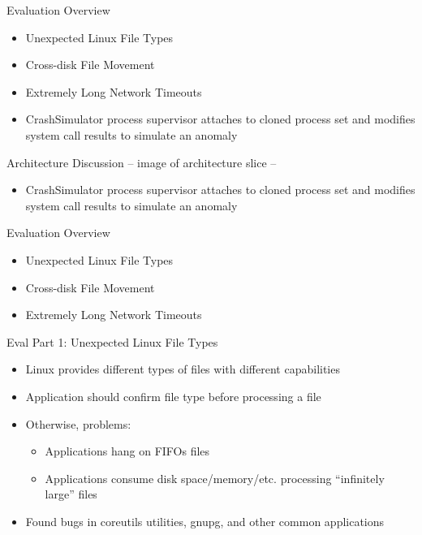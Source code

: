 \documentclass[pdf]{beamer}
\begin{document}
\begin{frame}{Evaluation Overview}
  \begin{itemize}
    \item{Unexpected Linux File Types}
    \item{Cross-disk File Movement}
    \item{Extremely Long Network Timeouts}
  \end{itemize}
  \begin{itemize}
    \item{CrashSimulator process supervisor attaches to cloned process set
      and modifies system call results to simulate an anomaly}
  \end{itemize}
\end{frame}


\begin{frame}{Architecture Discussion}
  -- image of architecture slice --
  \begin{itemize}
    \item{CrashSimulator process supervisor attaches to cloned process set
      and modifies system call results to simulate an anomaly}
  \end{itemize}
\end{frame}


\begin{frame}{Evaluation Overview}
  \begin{itemize}
    \item{Unexpected Linux File Types}
    \item{Cross-disk File Movement}
    \item{Extremely Long Network Timeouts}
  \end{itemize}
\end{frame}


\begin{frame}{Eval Part 1: Unexpected Linux File Types}
  \begin{itemize}
    \item{Linux provides different types of files with different capabilities}
    \item{Application should confirm file type before processing a file}
    \item{Otherwise, problems:}
      \begin{itemize}
        \item{Applications hang on FIFOs files}
        \item{Applications consume disk space/memory/etc. processing ``infinitely
          large'' files}
      \end{itemize}
    \item{Found bugs in coreutils utilities, gnupg, and other common
        applications}
  \end{itemize}
\end{frame}
\end{document}

